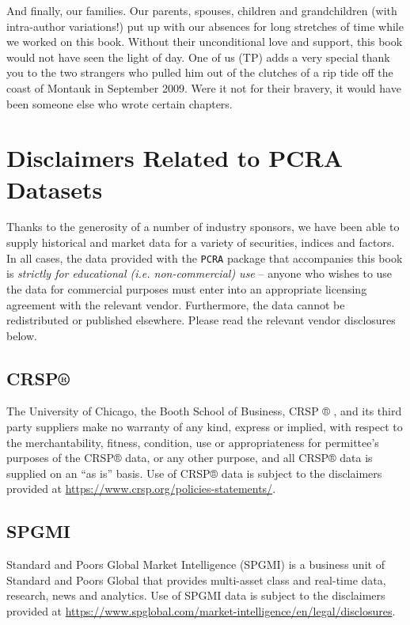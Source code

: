 \documentclass[graybox,envcountchap,sectrefs]{svmono}\usepackage[]{graphicx}\usepackage[]{xcolor}
\begin{document}
And finally, our families. Our parents, spouses, children and grandchildren
(with intra-author variations!) put up with our absences for long
stretches of time while we worked on this book. Without their unconditional
love and support, this book would not have seen the light of day.
One of us (TP) adds a very special thank you to the two strangers
who pulled him out of the clutches of a rip tide off the coast of
Montauk in September 2009. Were it not for their bravery, it would
have been someone else who wrote certain chapters.

\section*{Disclaimers Related to PCRA Datasets}

Thanks to the generosity of a number of industry sponsors, we have
been able to supply historical and market data for a variety of securities,
indices and factors. In all cases, the data provided with the \texttt{PCRA}
package  that accompanies this book is \emph{strictly for educational
(i.e. non-commercial) use} -- anyone who wishes to use the data for
commercial purposes must enter into an appropriate licensing agreement
with the relevant vendor. Furthermore, the data cannot be redistributed
or published elsewhere. Please read the relevant vendor disclosures
below.

\subsection*{CRSP®}

The University of Chicago, the Booth School of Business, CRSP ® ,
and its third party suppliers make no warranty of any kind, express
or implied, with respect to the merchantability, fitness, condition,
use or appropriateness for permittee’s purposes of the CRSP® data,
or any other purpose, and all CRSP® data is supplied on an “as is”
basis. Use of CRSP® data is subject to the disclaimers provided at
\url{https://www.crsp.org/policies-statements/}.

\subsection*{SPGMI}

Standard and Poors Global Market Intelligence (SPGMI) is a business
unit of Standard and Poors Global that provides multi-asset class
and real-time data, research, news and analytics. Use of SPGMI data
is subject to the disclaimers provided at \url{https://www.spglobal.com/market-intelligence/en/legal/disclosures}.
\end{document}
